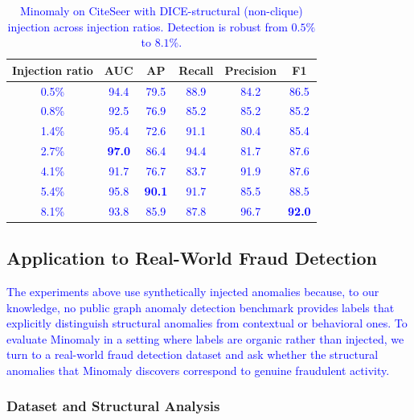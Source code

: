 \documentclass[preprint,12pt]{elsarticle}
\newcommand{\new}[1]{\textcolor{blue}{#1}}
\theoremstyle{plain}
\theoremstyle{definition}
\theoremstyle{remark}
\begin{document}
\begin{table}[htbp]
    \footnotesize
    \centering
    \caption{\new{Minomaly on CiteSeer with DICE-structural (non-clique) injection across injection ratios. Detection is robust from $0.5\%$ to $8.1\%$.}}
    \label{tab:citeseer_ratios}
    \begin{tabular}{|c|c|c|c|c|c|}
    \hline
    Injection ratio & AUC & AP & Recall & Precision & F1 \\ \hline
    \new{0.5\%} & \new{94.4} & \new{79.5} & \new{88.9} & \new{84.2} & \new{86.5} \\
    \new{0.8\%} & \new{92.5} & \new{76.9} & \new{85.2} & \new{85.2} & \new{85.2} \\
    \new{1.4\%} & \new{95.4} & \new{72.6} & \new{91.1} & \new{80.4} & \new{85.4} \\
    \new{2.7\%} & \new{\textbf{97.0}} & \new{86.4} & \new{94.4} & \new{81.7} & \new{87.6} \\
    \new{4.1\%} & \new{91.7} & \new{76.7} & \new{83.7} & \new{91.9} & \new{87.6} \\
    \new{5.4\%} & \new{95.8} & \new{\textbf{90.1}} & \new{91.7} & \new{85.5} & \new{88.5} \\
    \new{8.1\%} & \new{93.8} & \new{85.9} & \new{87.8} & \new{96.7} & \new{\textbf{92.0}} \\ \hline
    \end{tabular}
\end{table}

\subsection{Application to Real-World Fraud Detection}
\label{sec:fraud}

\new{The experiments above use synthetically injected anomalies because, to our knowledge, no public graph anomaly detection benchmark provides labels that explicitly distinguish structural anomalies from contextual or behavioral ones. To evaluate Minomaly in a setting where labels are organic rather than injected, we turn to a real-world fraud detection dataset and ask whether the structural anomalies that Minomaly discovers correspond to genuine fraudulent activity.}

\subsubsection{Dataset and Structural Analysis}
\end{document}
